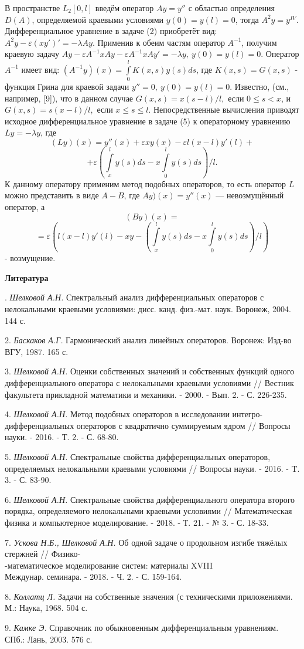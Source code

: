 В пространстве $L_{2}[0,l]$ введём оператор $Ay=y''$ с областью определения $D(A)$, определяемой краевыми условиями $y(0)=y(l)=0$, тогда $A^{2}y=y^{IV}$. Дифференциальное уравнение в задаче (2) приобретёт вид: $A^{2}y-\varepsilon(xy')'=-{\lambda}Ay$. Применив к обеим частям оператор $A^{-1}$, получим краевую задачу $Ay-{\varepsilon}A^{-1}xAy-{\varepsilon}A^{-1}xAy'=-{\lambda}y, ~ y(0)=y(l)=0$.
Оператор $A^{-1}$ имеет вид: $(A^{-1}y)(x)=\int\limits_0^l{K(x,s)y(s)}ds$, где $K(x,s)=G(x,s)$ - функция Грина для краевой задачи $y''=0,~y(0)=y(l)=0$.
Известно, (см., например, [9]), что в данном случае $G(x,s)=x(s-l)/l$,~если $0\le{s}<x$, и $G(x,s)=s(x-l)/l$,~если $x\le{s}\le{l}$.
Непосредственные вычисления приводят исходное дифференциальное уравнение в задаче (5) к операторному уравнению $Ly=-{\lambda}y$, где
$$(Ly)(x)=y''(x)+{\varepsilon}xy(x)-{\varepsilon}l(x-l)y'(l)+$$
$$+\varepsilon\left(\int\limits_x^l{y(s)}ds-x\int\limits_0^l{y(s)}ds\right)/l.$$
К данному оператору применим метод подобных операторов, то есть оператор $L$ можно представить в виде $A-B$, где $Ay)(x)=y''(x)$ --- невозмущённый оператор, а
$$(By)(x) = $$
$$ = {\varepsilon}\left(l(x-l)y'(l)-xy-\left(\int\limits_x^l{y(s)}ds-x\int\limits_0^l{y(s)}ds\right)/l\right)$$
- возмущение.



\smallskip \centerline {\bf Литература} . {\it Шелковой А.Н.} Спектральный анализ дифференциальных операторов с нелокальными краевыми условиями: дисс. канд. физ.-мат. наук. Воронеж, 2004. 144 с.

2. {\it Баскаков А.Г.} Гармонический анализ линейных операторов. Воронеж: Изд-во ВГУ, 1987. 165 с.

3. {\it Шелковой А.Н.} Оценки собственных значений и собственных функций одного дифференциального оператора с нелокальными краевыми условиями // Вестник факультета прикладной математики и механики. - 2000. - Вып. 2. - С. 226-235.

4. {\it Шелковой А.Н.} Метод подобных операторов в исследовании интегро-дифференциальных операторов с квадратично суммируемым ядром // Вопросы науки. - 2016. - Т. 2. - С. 68-80.

5. {\it Шелковой А.Н.} Спектральные свойства дифференциальных операторов, определяемых нелокальными краевыми условиями // Вопросы науки. - 2016. - T. 3. - С. 83-90.

6. {\it Шелковой А.Н.} Спектральные свойства дифференциального оператора второго порядка, определяемого нелокальными краевыми условиями // Математическая физика и компьютерное моделирование. - 2018. - Т. 21. - № 3. - С. 18-33.

7. {\it Ускова Н.Б., Шелковой А.Н.} Об одной задаче о продольном изгибе тяжёлых стержней // Физико-\\-математическое моделирование систем: материалы XVIII\\Междунар. семинара. - 2018. - Ч. 2. - С. 159-164.

8. {\it Коллатц Л.} Задачи на собственные значения (с техническими приложениями. М.: Наука, 1968. 504 с.

9. {\it Камке Э.} Справочник по обыкновенным дифференциальным уравнениям. СПб.: Лань, 2003. 576 с.
